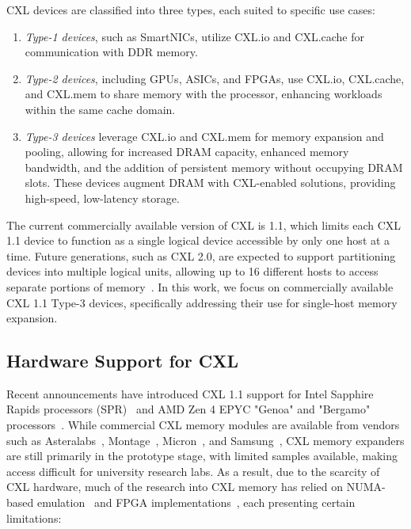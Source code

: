 CXL devices are classified into three types, each suited to specific use cases:
\begin{enumerate}[leftmargin=*, itemsep=0pt]
    \item \textit{Type-1 devices}, such as SmartNICs, utilize CXL.io and CXL.cache for communication with DDR memory.
    \item \textit{Type-2 devices}, including GPUs, ASICs, and FPGAs, use CXL.io, CXL.cache, and CXL.mem to share memory with the processor, enhancing workloads within the same cache domain.
    \item \textit{Type-3 devices} leverage CXL.io and CXL.mem for memory expansion and pooling, allowing for increased DRAM capacity, enhanced memory bandwidth, and the addition of persistent memory without occupying DRAM slots. These devices augment DRAM with CXL-enabled solutions, providing high-speed, low-latency storage.
\end{enumerate}

The current commercially available version of CXL is 1.1, which limits each CXL 1.1 device to function as a single logical device accessible by only one host at a time. Future generations, such as CXL 2.0, are expected to support partitioning devices into multiple logical units, allowing up to 16 different hosts to access separate portions of memory~\cite{sharma2023introduction}. In this work, we focus on commercially available CXL 1.1 Type-3 devices, specifically addressing their use for single-host memory expansion.



\subsection{Hardware Support for CXL}
\label{ssec:cxlhardware}

Recent announcements have introduced CXL 1.1 support for Intel Sapphire Rapids processors (SPR)~\cite{SPR} and AMD Zen 4 EPYC "Genoa" and "Bergamo" processors~\cite{amdgenoabergamo}. While commercial CXL memory modules are available from vendors such as Asteralabs~\cite{A1000}, Montage~\cite{mxc}, Micron~\cite{micron}, and Samsung~\cite{smt}, CXL memory expanders are still primarily in the prototype stage, with limited samples available, making access difficult for university research labs. As a result, due to the scarcity of CXL hardware, much of the research into CXL memory has relied on NUMA-based emulation~\cite{pond,tpp} and FPGA implementations~\cite{demystify, directcxl}, each presenting certain limitations:

